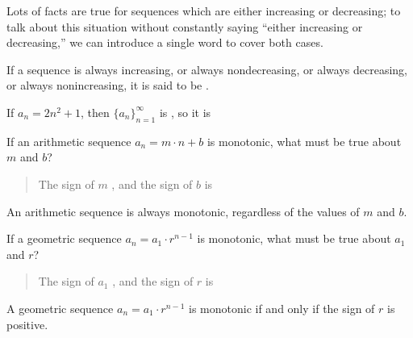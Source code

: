 \documentclass{ximera}
\begin{document}
Lots of facts are true for sequences which are either increasing or
decreasing; to talk about this situation without constantly saying
``either increasing or decreasing,'' we can introduce a single word to
cover both cases.
\begin{definition}
  If a sequence is always increasing, or  always nondecreasing, or always decreasing, or always nonincreasing, it is said to be .
\end{definition}


\begin{example}
If $a_n = 2n^2+1$, then $\{a_n\}_{n=1}^{\infty}$ is , so it is
\end{example}

\begin{question}
  If an arithmetic sequence $a_n = m\cdot n + b$ is monotonic, what
  must be true about $m$ and $b$?
  \begin{prompt}
    \begin{quote}
      The sign of $m$ , and the sign of $b$ is
    \end{quote}
  \end{prompt}
  \begin{feedback}
    An arithmetic sequence is always monotonic, regardless of the
    values of $m$ and $b$.
  \end{feedback}
\end{question}

\begin{question}
  If a geometric sequence $a_n = a_1 \cdot r^{n-1}$ is monotonic, what
  must be true about $a_1$ and $r$?
  \begin{prompt}
    \begin{quote}
      The sign of $a_1$ , and the sign of
      $r$ is 
    \end{quote}
  \end{prompt}
    \begin{feedback}
    A geometric sequence $a_n = a_1 \cdot r^{n-1}$ is monotonic if and
    only if the sign of $r$ is positive.
  \end{feedback}
\end{question}
\end{document}
